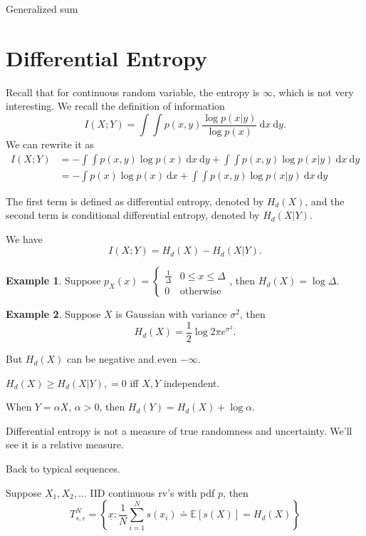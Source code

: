 \documentclass{report}
\newcommand{\idf}{\ \mathrm{d}}
\newcommand{\set}[1]{\left\lbrace #1 \right\rbrace}
\theoremstyle{definition}
\newtheorem{example}{Example}[section]
\theoremstyle{remark}
\numberwithin{equation}{section}
\begin{document}
Generalized sum 

\section{Differential Entropy}
Recall that for continuous random variable, the entropy is $\infty$, which is not very interesting. We recall the definition of information \[I(X;Y) = \int\int p(x, y)\frac{\log p(x|y)}{\log p(x)} \idf x \idf y.\]
We can rewrite it as \begin{align*}
  I(X;Y) & = -\int\int p(x, y){\log p(x)} \idf x \idf y + \int\int p(x, y)\log p(x|y) \idf x \idf y \\
  & = -\int p(x){\log p(x)} \idf x + \int\int p(x, y)\log p(x|y) \idf x \idf y
\end{align*}
  
The first term is defined as differential entropy, denoted by $H_d(X)$, and the second term is conditional differential entropy, denoted by $H_d(X|Y)$.

We have \[I(X; Y) = H_d(X) - H_d(X|Y).\]

\begin{example}
  Suppose $p_X(x) = \begin{cases}
    \frac{1}{\Delta} & 0 \leq x \leq \Delta \\
    0 & \text{otherwise}  
  \end{cases}$, then $H_d(X) = \log \Delta$.
\end{example}

\begin{example}
  Suppose $X$ is Gaussian with variance $\sigma^2$, then \[H_d(X) = \frac{1}{2}\log 2\pi e^{\sigma^2}.\]
\end{example}

But $H_d(X)$ can be negative and even $-\infty$.

$H_d(X) \geq H_d(X|Y), = 0$ iff $X, Y$ independent.

When $Y = \alpha X$, $\alpha > 0$, then $H_d(Y) = H_d(X) + \log \alpha$.

Differential entropy is not a measure of true randomness and uncertainty. We'll see it is a relative measure.

Back to typical sequences.

Suppose $X_1, X_2, \ldots$ IID continuous rv's with pdf $p$, then \[
T_{s,\varepsilon}^N = \set{\underline{x}: \frac{1}{N}\sum_{i=1}^N s(x_i) \doteq \mathbb E [s(X)] = H_d(X)}  
\]
\end{document}
